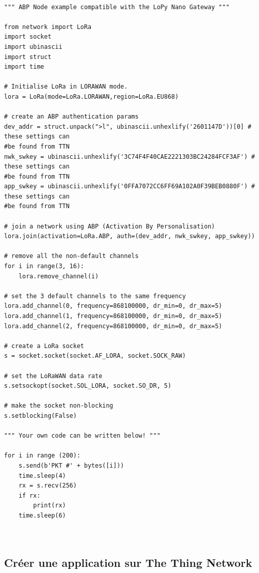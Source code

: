 \documentclass{article}
\begin{document}
\begin{verbatim}

""" ABP Node example compatible with the LoPy Nano Gateway """

from network import LoRa
import socket
import ubinascii
import struct
import time

# Initialise LoRa in LORAWAN mode.
lora = LoRa(mode=LoRa.LORAWAN,region=LoRa.EU868)

# create an ABP authentication params
dev_addr = struct.unpack(">l", ubinascii.unhexlify('2601147D'))[0] # these settings can 
#be found from TTN
nwk_swkey = ubinascii.unhexlify('3C74F4F40CAE2221303BC24284FCF3AF') # these settings can 
#be found from TTN
app_swkey = ubinascii.unhexlify('0FFA7072CC6FF69A102A0F39BEB0880F') # these settings can
#be found from TTN

# join a network using ABP (Activation By Personalisation)
lora.join(activation=LoRa.ABP, auth=(dev_addr, nwk_swkey, app_swkey))

# remove all the non-default channels
for i in range(3, 16):
    lora.remove_channel(i)

# set the 3 default channels to the same frequency
lora.add_channel(0, frequency=868100000, dr_min=0, dr_max=5)
lora.add_channel(1, frequency=868100000, dr_min=0, dr_max=5)
lora.add_channel(2, frequency=868100000, dr_min=0, dr_max=5)

# create a LoRa socket
s = socket.socket(socket.AF_LORA, socket.SOCK_RAW)

# set the LoRaWAN data rate
s.setsockopt(socket.SOL_LORA, socket.SO_DR, 5)

# make the socket non-blocking
s.setblocking(False)

""" Your own code can be written below! """

for i in range (200):
    s.send(b'PKT #' + bytes([i]))
    time.sleep(4)
    rx = s.recv(256)
    if rx:
        print(rx)
    time.sleep(6)



\end{verbatim}

\subsection{Créer une application sur The Thing Network}
\end{document}

